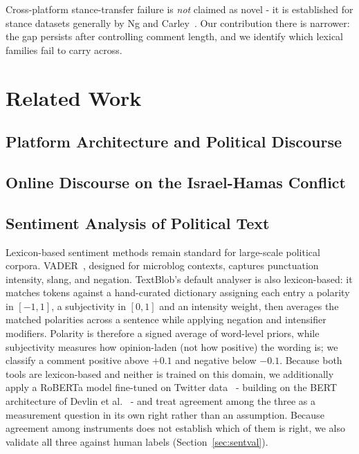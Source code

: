 Cross-platform stance-transfer failure is \emph{not} claimed as novel - it is
established for stance datasets generally by Ng and Carley~\cite{ng2022}. Our
contribution there is narrower: the gap persists after controlling comment length,
and we identify which lexical families fail to carry across.

\section{Related Work}
\subsection{Platform Architecture and Political Discourse}


\subsection{Online Discourse on the Israel-Hamas Conflict}


\subsection{Sentiment Analysis of Political Text}
Lexicon-based sentiment methods remain standard for large-scale political corpora.
VADER~\cite{hutto2014}, designed for microblog contexts, captures punctuation
intensity, slang, and negation. TextBlob's default analyser is also lexicon-based:
it matches tokens against a hand-curated dictionary assigning each entry a polarity
in $[-1,1]$, a subjectivity in $[0,1]$ and an intensity weight, then averages the
matched polarities across a sentence while applying negation and intensifier
modifiers. Polarity is therefore a signed average of word-level priors, while
subjectivity measures how opinion-laden (not how positive) the wording is; we
classify a comment positive above $+0.1$ and negative below $-0.1$. Because both
tools are lexicon-based and neither is trained on this domain, we additionally apply
a RoBERTa model fine-tuned on Twitter data~\cite{loureiro2022} - building on the
BERT architecture of
Devlin et al.~\cite{devlin2019} - and treat agreement among the three as a
measurement question in its own right rather than an assumption. Because agreement
among instruments does not establish which of them is right, we also validate all
three against human labels (Section~\ref{sec:sentval}).

